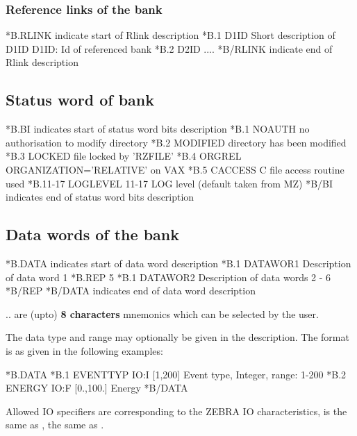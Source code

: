 \subsubsection*{Reference links of the bank}
 
\begin{XMP}
*B.RLINK            \lcb indicate start of Rlink description\rcb 
*B.1      D1ID     Short description of D1ID  \lcb D1ID: Id of referenced bank\rcb 
*B.2      D2ID     ....
*B/RLINK            \lcb indicate end of Rlink description\rcb 
\end{XMP}
 
\subsection{Status word of bank}
 
\begin{XMP}
*B.BI                \lcb indicates start of status word bits description\rcb 
*B.1      NOAUTH     no authorisation to modify directory
*B.2      MODIFIED   directory has been modified
*B.3      LOCKED     file locked by 'RZFILE'
*B.4      ORGREL     ORGANIZATION='RELATIVE' on VAX
*B.5      CACCESS    C file access routine used
*B.11-17  LOGLEVEL   11-17 LOG level (default taken from MZ)
*B/BI                \lcb indicates end of status word bits description\rcb 
\end{XMP}
 
\subsection{Data words of the bank}
 
\begin{XMP}
*B.DATA              \lcb indicates start of data word description\rcb 
*B.1      DATAWOR1   Description of data word 1
*B.REP    5
*B.1      DATAWOR2   Description of data words 2 - 6
*B/REP
*B/DATA              \lcb indicates end of data word description\rcb 
\end{XMP}
 
 ..  are (upto) {\bf 8 characters} mnemonics
which can be selected by the user.
 
The data type and range may optionally be given in the description.
The format is as given in the following examples:
\begin{XMP}
*B.DATA 
*B.1    EVENTTYP    IO:I [1,200] Event type, Integer, range: 1-200
*B.2    ENERGY      IO:F [0.,100.] Energy
*B/DATA 
\end{XMP}
Allowed IO specifiers are  corresponding to the
ZEBRA IO characteristics,  is the same as ,
 the same as .
 
